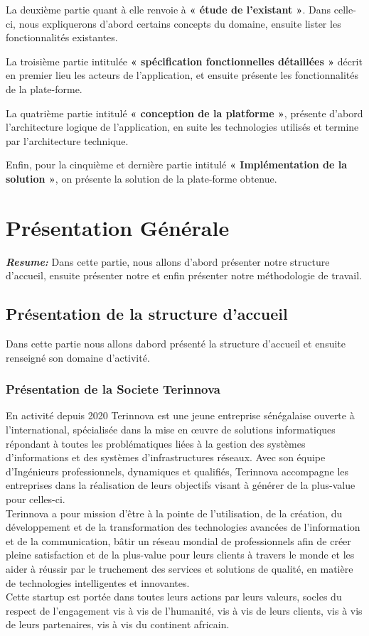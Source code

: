 \documentclass[a4paper, 12pt]{report}
\begin{document}
La deuxième partie quant à elle renvoie à \textbf{« étude de l'existant »}. Dans celle-ci,
nous expliquerons d’abord certains concepts du domaine, ensuite lister les fonctionnalités existantes.

La troisième partie intitulée \textbf{« spécification fonctionnelles détaillées »} décrit en
premier lieu les acteurs de l'application, et ensuite présente les fonctionnalités de la plate-forme.

La quatrième partie intitulé \textbf{« conception de la platforme »}, présente d'abord l'architecture logique de l'application, en suite les technologies utilisés et termine par l'architecture technique.

Enfin, pour la cinquième et dernière partie intitulé \textbf{« Implémentation de la solution »}, on présente la solution de la plate-forme obtenue. 


\chapter{Présentation Générale}
\textit{\textbf{Resume:} }
Dans cette partie, nous allons d'abord présenter notre structure d'accueil, ensuite présenter notre et enfin présenter notre méthodologie de travail.
\setcounter{minitocdepth}{2}
\minitoc
\newpage
\section{Présentation de la structure d'accueil}
Dans cette partie nous allons dabord présenté la structure d'accueil et ensuite renseigné son domaine d'activité.
\subsection{Présentation de la Societe Terinnova}
  {En activité depuis 2020 Terinnova est une jeune entreprise sénégalaise ouverte à l’international, spécialisée dans la mise en œuvre de solutions informatiques répondant à toutes les problématiques liées à la gestion des systèmes d’informations et des systèmes d’infrastructures réseaux. Avec son équipe d’Ingénieurs professionnels, dynamiques et qualifiés, Terinnova accompagne les entreprises dans la réalisation de leurs objectifs visant à générer de la plus-value pour celles-ci. \\
  Terinnova a pour mission d’être à la pointe de l’utilisation, de la création, du développement et de la transformation des technologies avancées de l’information et de la communication, bâtir un réseau mondial de professionnels afin de créer pleine satisfaction et de la plus-value pour leurs clients à travers le monde et les aider à réussir par le truchement des services et solutions de qualité, en matière de technologies intelligentes et innovantes. 
  \\
  Cette startup est portée dans toutes leurs actions par leurs valeurs, socles du respect de l'engagement vis à vis de l’humanité, vis à vis de leurs clients, vis à vis de leurs partenaires, vis à vis du continent africain.}
\end{document}
